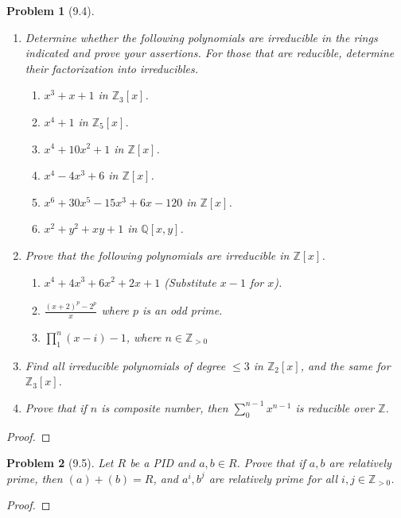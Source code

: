 \documentclass[10pt]{article}
\newcommand{\sk}{\vskip 10mm}
\newcommand{\bb}[1]{\mathbb{#1}}
\theoremstyle{plain}
\newtheorem{problem}{Problem}
\theoremstyle{remark}
\begin{document}
\begin{problem}[9.4]
  \begin{enumerate}
  \item Determine whether the following polynomials are irreducible in
    the rings indicated and prove your assertions. For those that are reducible,
    determine their factorization into irreducibles.
    \begin{enumerate}
    \item $x^3+x+1$ in $\bb{Z}_3[x]$.
    \item $x^4+1$ in $\bb{Z}_5[x]$.
    \item $x^4+10x^2+1$ in $\bb{Z}[x]$.
    \item $x^4-4x^3+6$ in $\bb{Z}[x]$.
    \item $x^6+30x^5-15x^3+6x-120$ in $\bb{Z}[x]$.
    \item $x^2+y^2+xy+1$ in $\bb{Q}[x,y]$.
    \end{enumerate}
  \item Prove that the following polynomials are irreducible in $\bb{Z}[x]$.
    \begin{enumerate}
    \item $x^4+4x^3+6x^2+2x+1$ (Substitute $x-1$ for $x$).
    \item $\frac{(x+2)^p-2^p}{x}$ where $p$ is an odd prime.
    \item $\prod_1^n(x-i) - 1$, where $n\in\bb{Z}_{>0}$
    \end{enumerate}
  \item Find all irreducible polynomials of degree $\leq 3$ in $\bb{Z}_2[x]$,
    and the same for $\bb{Z}_3[x]$.
  \item Prove that if $n$ is composite number, then $\sum_0^{n-1}x^{n-1}$ is
    reducible over $\bb{Z}$.
  \end{enumerate}
\end{problem}

\begin{proof}
  
\end{proof}

\sk


\begin{problem}[9.5]
  Let $R$ be a PID and $a,b\in R$. Prove that if $a,b$ are relatively
  prime, then $(a)+(b)=R$, and $a^i,b^j$ are relatively prime for all
  $i,j\in\bb{Z}_{>0}$.
\end{problem}

\begin{proof}
  
\end{proof}
\end{document}
